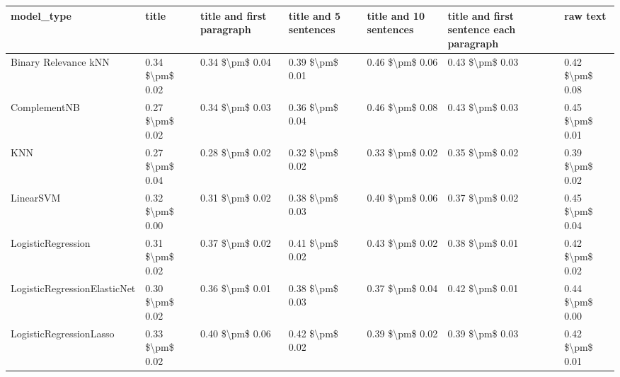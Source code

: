 \begin{tabular}{lllllll}
\toprule
                     model\_type &           title & title and first paragraph & title and 5 sentences & title and 10 sentences & title and first sentence each paragraph &            raw text \\
\midrule
           Binary Relevance kNN & 0.34 \$\textbackslash pm\$ 0.02 &           0.34 \$\textbackslash pm\$ 0.04 &       0.39 \$\textbackslash pm\$ 0.01 &        0.46 \$\textbackslash pm\$ 0.06 &                         0.43 \$\textbackslash pm\$ 0.03 &     0.42 \$\textbackslash pm\$ 0.08 \\
                   ComplementNB & 0.27 \$\textbackslash pm\$ 0.02 &           0.34 \$\textbackslash pm\$ 0.03 &       0.36 \$\textbackslash pm\$ 0.04 &        0.46 \$\textbackslash pm\$ 0.08 &                         0.43 \$\textbackslash pm\$ 0.03 &     0.45 \$\textbackslash pm\$ 0.01 \\
                            KNN & 0.27 \$\textbackslash pm\$ 0.04 &           0.28 \$\textbackslash pm\$ 0.02 &       0.32 \$\textbackslash pm\$ 0.02 &        0.33 \$\textbackslash pm\$ 0.02 &                         0.35 \$\textbackslash pm\$ 0.02 &     0.39 \$\textbackslash pm\$ 0.02 \\
                      LinearSVM & 0.32 \$\textbackslash pm\$ 0.00 &           0.31 \$\textbackslash pm\$ 0.02 &       0.38 \$\textbackslash pm\$ 0.03 &        0.40 \$\textbackslash pm\$ 0.06 &                         0.37 \$\textbackslash pm\$ 0.02 &     0.45 \$\textbackslash pm\$ 0.04 \\
             LogisticRegression & 0.31 \$\textbackslash pm\$ 0.02 &           0.37 \$\textbackslash pm\$ 0.02 &       0.41 \$\textbackslash pm\$ 0.02 &        0.43 \$\textbackslash pm\$ 0.02 &                         0.38 \$\textbackslash pm\$ 0.01 &     0.42 \$\textbackslash pm\$ 0.02 \\
   LogisticRegressionElasticNet & 0.30 \$\textbackslash pm\$ 0.02 &           0.36 \$\textbackslash pm\$ 0.01 &       0.38 \$\textbackslash pm\$ 0.03 &        0.37 \$\textbackslash pm\$ 0.04 &                         0.42 \$\textbackslash pm\$ 0.01 &     0.44 \$\textbackslash pm\$ 0.00 \\
        LogisticRegressionLasso & 0.33 \$\textbackslash pm\$ 0.02 &           0.40 \$\textbackslash pm\$ 0.06 &       0.42 \$\textbackslash pm\$ 0.02 &        0.39 \$\textbackslash pm\$ 0.02 &                         0.39 \$\textbackslash pm\$ 0.03 &     0.42 \$\textbackslash pm\$ 0.01 \\

\end{tabular}
